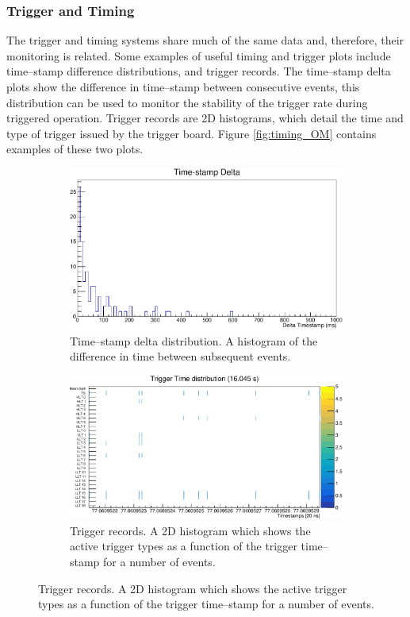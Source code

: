 \subsubsection*{Trigger and Timing}
The trigger and timing systems share much of the same data and, therefore, 
their monitoring is related. Some examples of useful timing and trigger plots 
include time--stamp difference distributions, and trigger records. The 
time--stamp delta plots show the difference in time--stamp between consecutive 
events, this distribution can be used to monitor the stability of the trigger 
rate during triggered operation. Trigger records are 2D histograms, which 
detail the time and type of trigger issued by the trigger board. Figure 
\ref{fig:timing_OM} contains examples of these two plots.

\begin{figure}

	\centering

	\begin{subfigure}[b]{0.8\textwidth}
		\centering
		\vspace{3mm}
		\includegraphics[width=\textwidth]{figures/timestamp_delta.pdf}
		\caption {Time--stamp delta distribution. A histogram of the difference in time
		between subsequent events.}
		\label{fig:timestamp_delta}
	\end{subfigure}

	\begin{subfigure}[b]{0.8\textwidth}
		\centering
		\vspace{3mm}
		\includegraphics[width=\textwidth]{figures/trigger_record.pdf}
		\caption {Trigger records. A 2D histogram which shows the active trigger
		types as a function of the trigger time--stamp for a number of events.}
		\label{fig:trig_record}
	\end{subfigure}


\end{figure}
